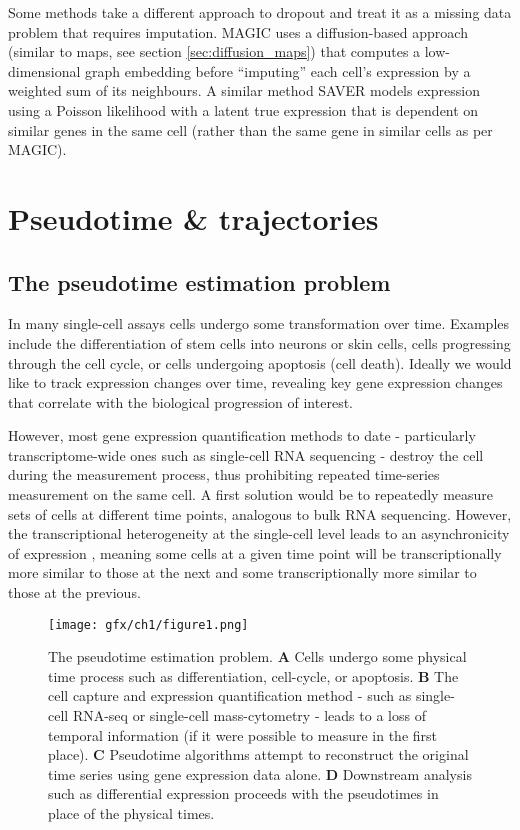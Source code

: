 Some methods take a different approach to dropout and treat it as a missing data problem that requires imputation. MAGIC \cite{Van_Dijk2017-wn} uses a diffusion-based approach (similar to maps, see section \ref{sec:diffusion_maps}) that computes a low-dimensional graph embedding before ``imputing'' each cell's expression by a weighted sum of its neighbours. A similar method SAVER \cite{SAVER} models expression using a Poisson likelihood with a latent true expression that is dependent on similar genes in the same cell (rather than the same gene in similar cells as per MAGIC).

\section{Pseudotime \& trajectories} \label{sec:pseudotime}


\subsection{The pseudotime estimation problem}

In many single-cell assays cells undergo some transformation over time. Examples include the differentiation of stem cells into neurons or skin cells, cells progressing through the cell cycle, or cells undergoing apoptosis (cell death). Ideally we would like to track expression changes over time, revealing key gene expression changes that correlate with the biological progression of interest.

However, most gene expression quantification methods to date - particularly transcriptome-wide ones such as single-cell RNA sequencing - destroy the cell during the measurement process, thus prohibiting repeated time-series measurement on the same cell. A first solution would be to repeatedly measure sets of cells at different time points, analogous to bulk RNA sequencing. However, the transcriptional heterogeneity at the single-cell level leads to an asynchronicity of expression \cite{Trapnell2014-xi}, meaning some cells at a given time point will be transcriptionally more similar to those at the next and some transcriptionally more similar to those at the previous.

\begin{figure}
\centering
  \texttt{[image: gfx/ch1/figure1.png]}
  \caption{The pseudotime estimation problem.
\textbf{A} Cells undergo some physical time process such as differentiation, cell-cycle, or apoptosis.
\textbf{B} The cell capture and expression quantification method - such as single-cell RNA-seq or single-cell mass-cytometry - leads to a loss of temporal information (if it were possible to measure in the first place).
\textbf{C} Pseudotime algorithms attempt to reconstruct the original time series using gene expression data alone.
\textbf{D} Downstream analysis such as differential expression proceeds with the pseudotimes in place of the physical times.
  } \label{fig:pseudotime}
\end{figure}

